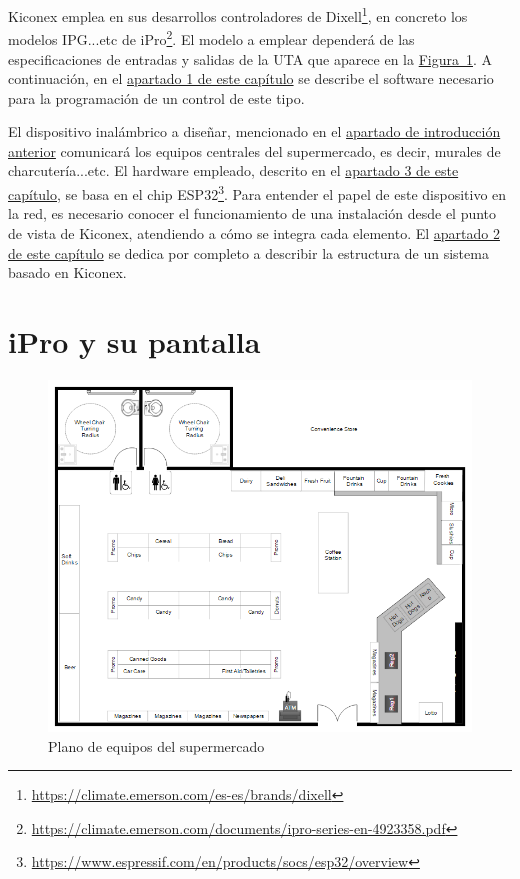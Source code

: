 Kiconex emplea en sus desarrollos controladores de Dixell\footnote{\url{https://climate.emerson.com/es-es/brands/dixell}}, en concreto los modelos IPG...etc de iPro\footnote{\url{https://climate.emerson.com/documents/ipro-series-en-4923358.pdf}}. El modelo a emplear dependerá de las especificaciones de entradas y salidas de la UTA que aparece en la \hyperref[figura:planoSupermercado]{Figura~\ref{figura:planoSupermercado}}. A continuación, en el \hyperref[sec:kiconex]{apartado 1 de este capítulo} se describe el software necesario para la programación de un control de este tipo.

El dispositivo inalámbrico a diseñar, mencionado en el \hyperref[chap:intro]{apartado de introducción anterior} comunicará los equipos centrales del supermercado, es decir, murales de charcutería...etc. El hardware empleado, descrito en el \hyperref[sec:esp32poe]{apartado 3 de este capítulo}, se basa en el chip ESP32\footnote{\url{https://www.espressif.com/en/products/socs/esp32/overview}}. Para entender el papel de este dispositivo en la red, es necesario conocer el funcionamiento de una instalación desde el punto de vista de Kiconex, atendiendo a cómo se integra cada elemento. El \hyperref[sec:kiconex]{apartado 2 de este capítulo} se dedica por completo a describir la estructura de un sistema basado en Kiconex.

\section{iPro y su pantalla}
\label{sec:iproypantalla}

\begin{figure}[h]
  \centering
  \includegraphics[width=12cm, keepaspectratio]{img/planoSupermercado}
  \caption{Plano de equipos del supermercado}
  \label{figura:planoSupermercado}
\end{figure}

